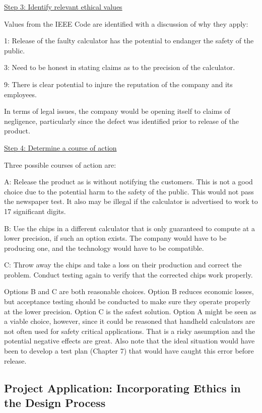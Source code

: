 \ul{Step 3: Identify relevant ethical values}

Values from the IEEE Code are identified with a discussion of why they
apply:

1: Release of the faulty calculator has the potential to endanger the
safety of the public.

3: Need to be honest in stating claims as to the precision of the
calculator.

9: There is clear potential to injure the reputation of the company and
its employees.

In terms of legal issues, the company would be opening itself to claims
of negligence, particularly since the defect was identified prior to
release of the product.

\ul{Step 4: Determine a course of action}

Three possible courses of action are:

A: Release the product as is without notifying the customers. This is
not a good choice due to the potential harm to the safety of the public.
This would not pass the newspaper test. It also may be illegal if the
calculator is advertised to work to 17 significant digits.

B: Use the chips in a different calculator that is only guaranteed to
compute at a lower precision, if such an option exists. The company
would have to be producing one, and the technology would have to be
compatible.

C: Throw away the chips and take a loss on their production and correct
the problem. Conduct testing again to verify that the corrected chips
work properly.

Options B and C are both reasonable choices. Option B reduces economic
losses, but acceptance testing should be conducted to make sure they
operate properly at the lower precision. Option C is the safest
solution. Option A might be seen as a viable choice, however, since it
could be reasoned that handheld calculators are not often used for
safety critical applications. That is a risky assumption and the
potential negative effects are great. Also note that the ideal situation
would have been to develop a test plan (Chapter 7) that would have
caught this error before release.

\subsection{Project Application: Incorporating Ethics in the Design
Process}\label{project-application-incorporating-ethics-in-the-design-process}

